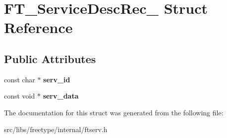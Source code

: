 \hypertarget{struct_f_t___service_desc_rec__}{
\section{FT\_\-ServiceDescRec\_\- Struct Reference}
\label{struct_f_t___service_desc_rec__}
}
\subsection*{Public Attributes}
\begin{DoxyCompactItemize}
\item 
\hypertarget{struct_f_t___service_desc_rec___ab706270db01e1398233571f10bd249d4}{
const char $\ast$ {\bfseries serv\_\-id}}
\label{struct_f_t___service_desc_rec___ab706270db01e1398233571f10bd249d4}

\item 
\hypertarget{struct_f_t___service_desc_rec___aa597a33a2b0d099ec32882dc6aa38d59}{
const void $\ast$ {\bfseries serv\_\-data}}
\label{struct_f_t___service_desc_rec___aa597a33a2b0d099ec32882dc6aa38d59}

\end{DoxyCompactItemize}


The documentation for this struct was generated from the following file:\begin{DoxyCompactItemize}
\item 
src/libs/freetype/internal/ftserv.h\end{DoxyCompactItemize}
